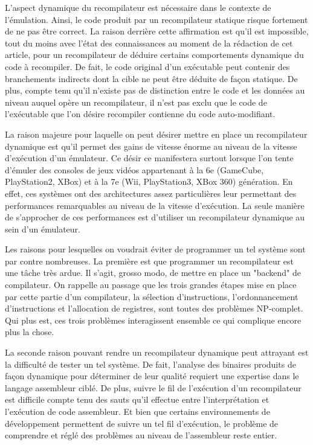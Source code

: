 \documentclass{article} %
\begin{document}
L'aspect dynamique du recompilateur est nécessaire dans le contexte de l'émulation. Ainsi, le code produit par un recompilateur statique risque fortement de ne pas être correct. La raison derrière cette affirmation est qu'il est impossible, tout du moins avec l'état des connaissances au moment de la rédaction de cet article, pour un recompilateur de déduire certains comportements dynamique du code à recompiler. De fait, le code original d'un exécutable peut contenir des branchements indirects dont la cible ne peut être déduite de façon statique. De plus, compte tenu qu'il n'existe pas de distinction entre le code et les données au niveau auquel opère un recompilateur, il n'est pas exclu que le code de l'exécutable que l'on désire recompiler contienne du code auto-modifiant.

La raison majeure pour laquelle on peut désirer mettre en place un recompilateur dynamique est qu'il permet des gains de vitesse énorme au niveau de la vitesse d'exécution d'un émulateur. Ce désir ce manifestera surtout lorsque l'on tente d'émuler des consoles de jeux vidéos appartenant à la 6e (GameCube, PlayStation2, XBox) et à la 7e (Wii, PlayStation3, XBox 360) génération. En effet, ces systèmes ont des architectures assez particulières leur permettant des performances remarquables au niveau de la vitesse d'exécution. La seule manière de s'approcher de ces performances est d'utiliser un recompilateur dynamique au sein d'un émulateur.

Les raisons pour lesquelles on voudrait éviter de programmer un tel système sont par contre nombreuses. La première est que programmer un recompilateur est une tâche très ardue. Il s'agit, grosso modo, de mettre en place un "backend" de compilateur. On rappelle au passage que les trois grandes étapes mise en place par cette partie d'un compilateur, la sélection d'instructions, l'ordonnancement d'instructions et l'allocation de registres, sont toutes des problèmes NP-complet. Qui plus est, ces trois problèmes interagissent ensemble ce qui complique encore plus la chose. 

La seconde raison pouvant rendre un recompilateur dynamique peut attrayant est la difficulté de tester un tel système. De fait, l'analyse des binaires produits de façon dynamique pour déterminer de leur qualité requiert une expertise dans le langage assembleur ciblé. De plus, suivre le fil de l'exécution d'un recompilateur est difficile compte tenu des sauts qu'il effectue entre l'interprétation et l'exécution de code assembleur. Et bien que certains environnements de développement permettent de suivre un tel fil d'exécution, le problème de comprendre et réglé des problèmes au niveau de l'assembleur reste entier.
\end{document}
